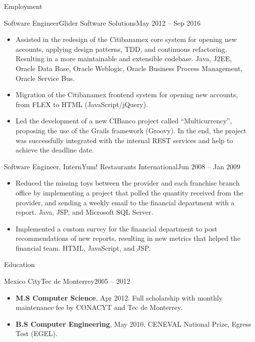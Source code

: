 \documentclass[calibri]{../mcdowell-cv/mcdowellcv}
\begin{document}
\begin{cvsection}{Employment}
		\begin{cvsubsection}{Software Engineer}{Glider Software Solutions}{May 2012 -- Sep 2016}	
			\begin{itemize}
				\item Assisted in the redesign of the Citibanamex core system for opening new accounts, applying design patterns, TDD, and continuous refactoring. Resulting in a more maintainable and extensible codebase. Java, J2EE, Oracle Data Base, Oracle Weblogic, Oracle Business Process Management, Oracle Service Bus.
				\item Migration of the Citibanamex frontend system for opening new accounts, from FLEX to HTML (JavaScript/jQuery).
				\item Led the development of a new CIBanco project called ``Multicurrency'', proposing the use of the Grails framework (Groovy). In the end, the project was successfully integrated with the internal REST services and help to achieve the deadline date.
			\end{itemize}
		\end{cvsubsection}

		\begin{cvsubsection}{Software Engineer, Intern}{Yum! Restaurants International}{Jun 2008 -- Jan 2009}
			\begin{itemize}
				\item Reduced the missing toys between the provider and each franchise branch office by implementing a project that polled the quantity received from the provider, and sending a weekly email to the financial department with a report. Java, JSP, and Microsoft SQL Server.
				\item Implemented a custom survey for the financial department to post recommendations of new reports, resulting in new metrics that helped the financial team. HTML, JavaScript, and JSP.
			\end{itemize}
		\end{cvsubsection}
	\end{cvsection}

	\begin{cvsection}{Education}
		\begin{cvsubsection}{Mexico City}{Tec de Monterrey}{2005 -- 2012}
			\begin{itemize}
				\item \textbf{M.S Computer Science}, Apr 2012. Full scholarship with monthly maintenance fee by CONACYT and Tec de Monterrey.
				\item \textbf{B.S Computer Engineering}, May 2010. CENEVAL National Prize, Egress Test (EGEL).
			\end{itemize}
		\end{cvsubsection}
	\end{cvsection}
	
\end{document}
